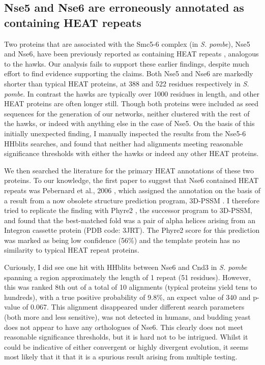 \documentclass[a4paper,11pt,twoside,openright]{scrbook}
\begin{document}
\subsection{Nse5 and Nse6 are erroneously annotated as containing HEAT repeats}
Two proteins that are associated with the Smc5-6 complex (in \textit{S. pombe}), Nse5 and Nse6, have been previously reported as containing HEAT repeats \cite{Stephan2011,Palecek2015,Alt2017}, analogous to the hawks. Our analysis fails to support these earlier findings, despite much effort to find evidence supporting the claims. Both Nse5 and Nse6 are markedly shorter than typical HEAT proteins, at 388 and 522 residues respectively in \textit{S. pombe}. In contrast the hawks are typically over 1000 residues in length, and other HEAT proteins are often longer still. Though both proteins were included as seed sequences for the generation of our networks, neither clustered with the rest of the hawks, or indeed with anything else in the case of Nse5. On the basis of this initially unexpected finding, I manually inspected the results from the Nse5-6 HHblits searches, and found that neither had alignments meeting reasonable significance thresholds with either the hawks or indeed any other HEAT proteins.

We then searched the literature for the primary HEAT annotations of these two proteins. To our knowledge, the first paper to suggest that Nse6 contained HEAT repeats was Pebernard et al., 2006 \cite{Pebernard2006}, which assigned the annotation on the basis of a result from a now obsolete structure prediction program, 3D-PSSM \cite{Kelley2000}. I therefore tried to replicate the finding with Phyre2 \cite{Kelley2015}, the successor program to 3D-PSSM, and found that the best-matched fold was a pair of alpha helices arising from an Integron cassette protein (PDB code: 3JRT). The Phyre2 score for this prediction was marked as being low confidence (56\%) and the template protein has no similarity to typical HEAT repeat proteins.

Curiously, I did see one hit with HHblits between Nse6 and Cnd3 in \textit{S. pombe} spanning a region approximately the length of 1 repeat (51 residues). However, this was ranked 8th out of a total of 10 alignments (typical proteins yield tens to hundreds), with a true positive probability of 9.8\%, an expect value of 340 and p-value of 0.067. This alignment disappeared under different search parameters (both more and less sensitive), was not detected in humans, and budding yeast does not appear to have any orthologues of Nse6. This clearly does not meet reasonable significance thresholds, but it is hard not to be intrigued. Whilst it could be indicative of either convergent or highly divergent evolution, it seems most likely that it that it is a spurious result arising from multiple testing.
\end{document}
